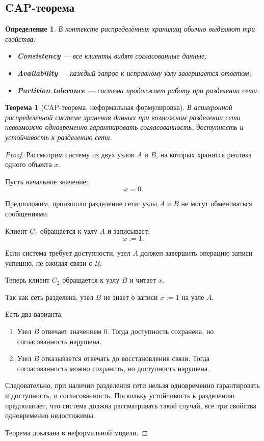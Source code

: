 \documentclass[12pt,a4paper]{article}
\newtheorem{definition}{Определение}
\newtheorem{theorem}{Теорема}
\begin{document}
\subsection{CAP-теорема}

\begin{definition}
В контексте распределённых хранилищ обычно выделяют три свойства:
\begin{itemize}
    \item \textbf{Consistency} --- все клиенты видят согласованные данные;
    \item \textbf{Availability} --- каждый запрос к исправному узлу завершается ответом;
    \item \textbf{Partition tolerance} --- система продолжает работу при разделении сети.
\end{itemize}
\end{definition}

\begin{theorem}[CAP-теорема, неформальная формулировка]
В асинхронной распределённой системе хранения данных при возможном разделении сети невозможно одновременно гарантировать согласованность, доступность и устойчивость к разделению сети.
\end{theorem}

\begin{proof}
Рассмотрим систему из двух узлов $A$ и $B$, на которых хранится реплика одного объекта $x$.

Пусть начальное значение:
\[
x=0.
\]

Предположим, произошло разделение сети: узлы $A$ и $B$ не могут обмениваться сообщениями.

Клиент $C_1$ обращается к узлу $A$ и записывает:
\[
x:=1.
\]

Если система требует доступности, узел $A$ должен завершить операцию записи успешно, не ожидая связи с $B$.

Теперь клиент $C_2$ обращается к узлу $B$ и читает $x$.

Так как сеть разделена, узел $B$ не знает о записи $x:=1$ на узле $A$.

Есть два варианта:
\begin{enumerate}
    \item Узел $B$ отвечает значением $0$. Тогда доступность сохранена, но согласованность нарушена.
    \item Узел $B$ отказывается отвечать до восстановления связи. Тогда согласованность можно сохранить, но доступность нарушена.
\end{enumerate}

Следовательно, при наличии разделения сети нельзя одновременно гарантировать и доступность, и согласованность. Поскольку устойчивость к разделению предполагает, что система должна рассматривать такой случай, все три свойства одновременно недостижимы.

Теорема доказана в неформальной модели.
\end{proof}
\end{document}
